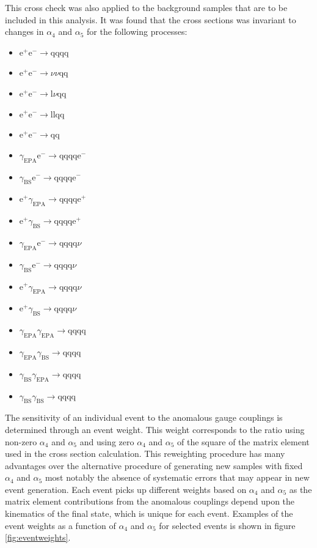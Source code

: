 This cross check was also applied to the background samples that are to be included in this analysis. It was found that the cross sections was invariant to changes in $\alpha_{4}$ and $\alpha_{5}$ for the following processes:

\begin{itemize}
\item $\text{e}^{+}\text{e}^{-} \rightarrow \text{qqqq}$
\item $\text{e}^{+}\text{e}^{-} \rightarrow \nu{\nu}\text{qq}$
\item $\text{e}^{+}\text{e}^{-} \rightarrow \text{l}\nu\text{qq}$
\item $\text{e}^{+}\text{e}^{-} \rightarrow \text{llqq}$
\item $\text{e}^{+}\text{e}^{-} \rightarrow \text{qq}$
\item $\gamma_{\text{EPA}}\text{e}^{-} \rightarrow \text{qqqq}\text{e}^{-}$
\item $\gamma_{\text{BS}}\text{e}^{-} \rightarrow \text{qqqq}\text{e}^{-}$
\item $\text{e}^{+}\gamma_{\text{EPA}} \rightarrow \text{qqqq}\text{e}^{+}$
\item $\text{e}^{+}\gamma_{\text{BS}} \rightarrow \text{qqqq}\text{e}^{+}$
\item $\gamma_{\text{EPA}}\text{e}^{-} \rightarrow \text{qqqq}\nu$
\item $\gamma_{\text{BS}}\text{e}^{-} \rightarrow \text{qqqq}\nu$
\item $\text{e}^{+}\gamma_{\text{EPA}} \rightarrow \text{qqqq}\nu$
\item $\text{e}^{+}\gamma_{\text{BS}} \rightarrow \text{qqqq}\nu$
\item $\gamma_{\text{EPA}}\gamma_{\text{EPA}} \rightarrow \text{qqqq}$
\item $\gamma_{\text{EPA}}\gamma_{\text{BS}} \rightarrow \text{qqqq}$
\item $\gamma_{\text{BS}}\gamma_{\text{EPA}} \rightarrow \text{qqqq}$ 
\item $\gamma_{\text{BS}}\gamma_{\text{BS}} \rightarrow \text{qqqq}$  
\end{itemize}

The sensitivity of an individual event to the anomalous gauge couplings is determined through an event weight. This weight corresponds to the ratio using non-zero $\alpha_{4}$ and $\alpha_{5}$ and using zero $\alpha_{4}$ and $\alpha_{5}$ of the square of the matrix element used in the cross section calculation. This reweighting procedure has many advantages over the alternative procedure of generating new samples with fixed $\alpha_{4}$ and $\alpha_{5}$ most notably the absence of systematic errors that may appear in new event generation. Each event picks up different weights based on $\alpha_{4}$ and $\alpha_{5}$ as the matrix element contributions from the anomalous couplings depend upon the kinematics of the final state, which is unique for each event. Examples of the event weights as a function of $\alpha_{4}$ and $\alpha_{5}$ for selected events is shown in figure \ref{fig:eventweights}.

